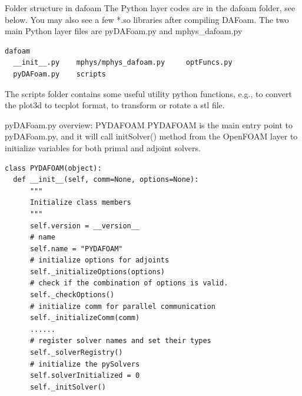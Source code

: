 \documentclass{bredelebeamer}
\begin{document}
\begin{frame}[fragile]{Folder structure in dafoam}
The Python layer codes are in the dafoam folder, see below. You may also see a few *.so libraries after compiling DAFoam. The two main Python layer files are pyDAFoam.py and mphys\_dafoam.py
\footnotesize
\lstset{ language=bash }
\begin{lstlisting}
dafoam
  __init__.py    mphys/mphys_dafoam.py     optFuncs.py    
  pyDAFoam.py    scripts
\end{lstlisting}
\normalsize

The scripts folder contains some useful utility python functions, e.g., to convert the plot3d to tecplot format, to transform or rotate a stl file.
\end{frame}


\begin{frame}[fragile]{pyDAFoam.py overview: PYDAFOAM}
PYDAFOAM is the main entry point to pyDAFoam.py, and it will call initSolver() method from the OpenFOAM layer to initialize variables for both primal and adjoint solvers.
\footnotesize
\lstset{ language=python }
\begin{lstlisting}
class PYDAFOAM(object):
  def __init__(self, comm=None, options=None):
      """
      Initialize class members
      """
      self.version = __version__
      # name
      self.name = "PYDAFOAM"
      # initialize options for adjoints
      self._initializeOptions(options)
      # check if the combination of options is valid.
      self._checkOptions()
      # initialize comm for parallel communication
      self._initializeComm(comm)
      ......
      # register solver names and set their types
      self._solverRegistry()
      # initialize the pySolvers
      self.solverInitialized = 0
      self._initSolver()
\end{lstlisting}
\normalsize

\end{frame}
\end{document}
